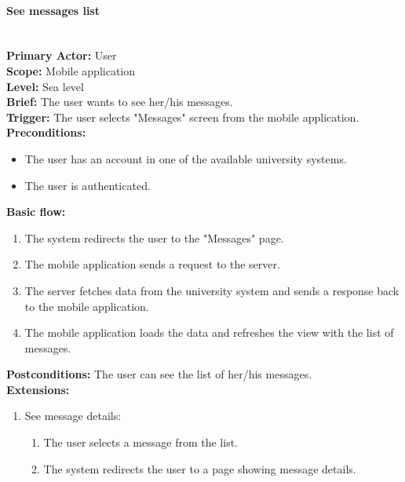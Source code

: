 \paragraph{\large{See messages list}}\mbox{}\\[2pt]
\textbf{Primary Actor:} User\\
\textbf{Scope:} Mobile application\\
\textbf{Level:} Sea level\\
\textbf{Brief:} The user wants to see her/his messages.\\
\textbf{Trigger:} The user selects "Messages" screen from the mobile application.\\
\textbf{Preconditions:}
\begin{itemize}
    \item The user has an account in one of the available university systems.
    \item The user is authenticated.
\end{itemize}
\textbf{Basic flow:}
\begin{enumerate}
    \item The system redirects the user to the "Messages" page.
    \item The mobile application sends a request to the server.
    \item The server fetches data from the university system and sends a response back to the mobile application.
    \item The mobile application loads the data and refreshes the view with the list of messages.
\end{enumerate}
\textbf{Postconditions:}
The user can see the list of her/his messages.\\
\textbf{Extensions:}
\begin{enumerate}[label=\alph*.]
    \item See message details:
    \begin{enumerate}
        \item The user selects a message from the list.
        \item The system redirects the user to a page showing message details.
    \end{enumerate}
\end{enumerate}


